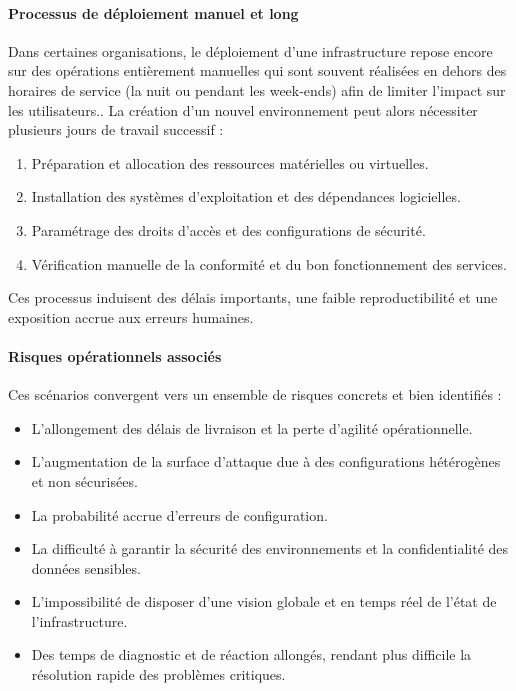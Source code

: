 \paragraph{\textbf{Processus de déploiement manuel et long}}

Dans certaines organisations, le déploiement d’une infrastructure repose encore sur des opérations entièrement manuelles qui sont souvent réalisées en dehors des horaires de service (la nuit ou pendant les week-ends) afin de limiter l’impact sur les utilisateurs.. La création d’un nouvel environnement peut alors nécessiter plusieurs jours de travail successif :

\begin{enumerate}
	\item Préparation et allocation des ressources matérielles ou virtuelles.
	\item Installation des systèmes d’exploitation et des dépendances logicielles.
	\item Paramétrage des droits d’accès et des configurations de sécurité.
	\item Vérification manuelle de la conformité et du bon fonctionnement des services.
\end{enumerate}

Ces processus induisent des délais importants, une faible reproductibilité et une exposition accrue aux erreurs humaines.

\paragraph{\textbf{Risques opérationnels associés}}

Ces scénarios convergent vers un ensemble de risques concrets et bien identifiés :

\begin{itemize}
	\item L’allongement des délais de livraison et la perte d’agilité opérationnelle.
	\item L’augmentation de la surface d’attaque due à des configurations hétérogènes et non sécurisées.
	\item La probabilité accrue d’erreurs de configuration.
	\item La difficulté à garantir la sécurité des environnements et la confidentialité des données sensibles.
	\item L’impossibilité de disposer d’une vision globale et en temps réel de l’état de l’infrastructure.
	\item Des temps de diagnostic et de réaction allongés, rendant plus difficile la résolution rapide des problèmes critiques.
\end{itemize}

